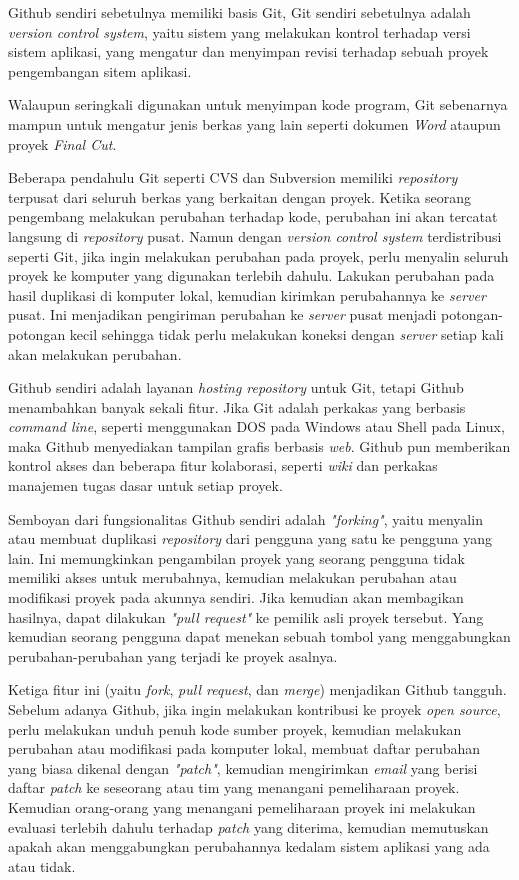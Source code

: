 \documentclass[pdftex,12pt, oneside]{article}
\begin{document}
Github sendiri sebetulnya memiliki basis Git, Git sendiri sebetulnya adalah \textit{version control system}, yaitu sistem yang melakukan kontrol terhadap versi sistem aplikasi, yang mengatur dan menyimpan revisi terhadap sebuah proyek pengembangan sitem aplikasi. 

Walaupun seringkali digunakan untuk menyimpan kode program, Git sebenarnya mampun untuk mengatur jenis berkas yang lain seperti dokumen \textit{Word} ataupun proyek \textit{Final Cut}.

Beberapa pendahulu Git seperti CVS dan Subversion memiliki \textit{repository} terpusat dari seluruh berkas yang berkaitan dengan proyek. Ketika seorang pengembang melakukan perubahan terhadap kode, perubahan ini akan tercatat langsung di \textit{repository} pusat. Namun dengan \textit{version control system} terdistribusi seperti Git, jika ingin melakukan perubahan pada proyek, perlu menyalin seluruh proyek ke komputer yang digunakan terlebih dahulu. Lakukan perubahan pada hasil duplikasi di komputer lokal, kemudian kirimkan perubahannya ke \textit{server} pusat. Ini menjadikan pengiriman perubahan ke \textit{server} pusat menjadi potongan-potongan kecil sehingga tidak perlu melakukan koneksi dengan \textit{server} setiap kali akan melakukan perubahan.

Github sendiri adalah layanan \textit{hosting repository} untuk Git, tetapi Github menambahkan banyak sekali fitur. Jika Git adalah perkakas yang berbasis \textit{command line}, seperti menggunakan DOS pada Windows atau Shell pada Linux, maka Github menyediakan tampilan grafis berbasis \textit{web}. Github pun memberikan kontrol akses dan beberapa fitur kolaborasi, seperti \textit{wiki} dan perkakas manajemen tugas dasar untuk setiap proyek.

Semboyan dari fungsionalitas Github sendiri adalah \textit{"forking"}, yaitu menyalin atau membuat duplikasi \textit{repository} dari pengguna yang satu ke pengguna yang lain. Ini memungkinkan pengambilan proyek yang seorang pengguna tidak memiliki akses untuk merubahnya, kemudian melakukan perubahan atau modifikasi proyek pada akunnya sendiri. Jika kemudian akan membagikan hasilnya, dapat dilakukan \textit{"pull request"} ke pemilik asli proyek tersebut. Yang kemudian seorang pengguna dapat menekan sebuah tombol yang menggabungkan perubahan-perubahan yang terjadi ke proyek asalnya.

Ketiga fitur ini (yaitu \textit{fork}, \textit{pull request}, dan \textit{merge}) menjadikan Github tangguh. Sebelum adanya Github, jika ingin melakukan kontribusi ke proyek \textit{open source}, perlu melakukan unduh penuh kode sumber proyek, kemudian melakukan perubahan atau modifikasi pada komputer lokal, membuat daftar perubahan yang biasa dikenal dengan \textit{"patch"}, kemudian mengirimkan \textit{email} yang berisi daftar \textit{patch} ke seseorang atau tim yang menangani pemeliharaan proyek. Kemudian orang-orang yang menangani pemeliharaan proyek ini melakukan evaluasi terlebih dahulu terhadap \textit{patch} yang diterima, kemudian memutuskan apakah akan menggabungkan perubahannya kedalam sistem aplikasi yang ada atau tidak.
\end{document}

